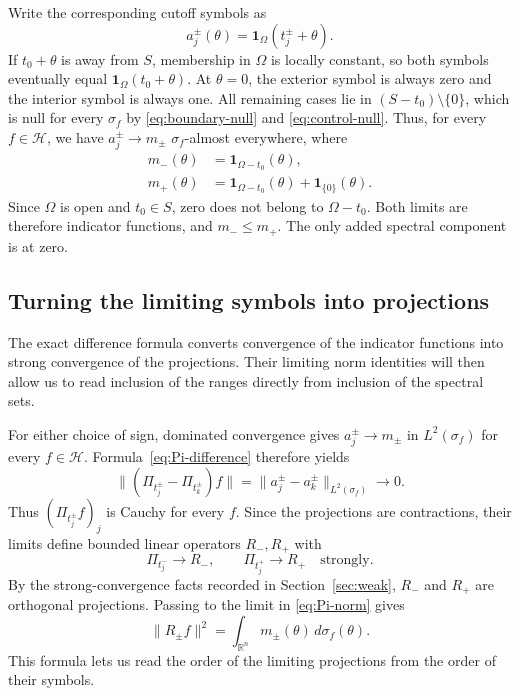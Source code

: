\documentclass[a4paper,12pt,reqno]{amsart}
\newcommand{\lead}[1]{\par\smallskip\noindent\leavevmode#1\par\smallskip}
\theoremstyle{remark}
\numberwithin{equation}{section}
\newcommand{\R}{\mathbb R}
\newcommand{\Hh}{\mathcal H}
\newcommand{\one}{\mathbf 1}
\begin{document}
Write the corresponding cutoff symbols as
\[
 a_j^\pm(\theta)=\one_\Omega(t_j^\pm+\theta).
\]
If $t_0+\theta$ is away from $S$, membership in $\Omega$ is locally
constant, so both symbols eventually equal
$\one_\Omega(t_0+\theta)$.  At $\theta=0$, the exterior symbol is
always zero and the interior symbol is always one.  All remaining
cases lie in $(S-t_0)\setminus\{0\}$, which is null for every
$\sigma_f$ by \eqref{eq:boundary-null} and \eqref{eq:control-null}.
Thus, for every $f\in\Hh$, we have $a_j^\pm\to m_\pm$
$\sigma_f$-almost everywhere, where
\begin{align}
 m_-(\theta)&=\one_{\Omega-t_0}(\theta),\label{eq:mminus}\\
 m_+(\theta)&=\one_{\Omega-t_0}(\theta)+\one_{\{0\}}(\theta).
 \label{eq:mplus}
\end{align}
Since $\Omega$ is open and $t_0\in S$, zero does not belong to
$\Omega-t_0$.  Both limits are therefore indicator functions, and
$m_-\leq m_+$.  The only added spectral component is at zero.

\subsection{Turning the limiting symbols into projections}

\lead{The exact difference formula converts convergence of the indicator
functions into strong convergence of the projections. Their limiting norm
identities will then allow us to read inclusion of the ranges directly
from inclusion of the spectral sets.}


For either choice of sign, dominated convergence gives
$a_j^\pm\to m_\pm$ in $L^2(\sigma_f)$ for every $f\in\Hh$.
Formula~\eqref{eq:Pi-difference} therefore yields
\[
 \|(\Pi_{t_j^\pm}-\Pi_{t_k^\pm})f\|
 =\|a_j^\pm-a_k^\pm\|_{L^2(\sigma_f)}
 \longrightarrow0.
\]
Thus $(\Pi_{t_j^\pm}f)_j$ is Cauchy for every $f$. Since the projections
are contractions, their limits define bounded linear operators $R_-,R_+$
with
\begin{equation}\label{eq:boundary-strong}
 \Pi_{t_j^-}\longrightarrow R_-,\qquad
 \Pi_{t_j^+}\longrightarrow R_+
 \quad\text{strongly}.
\end{equation}
By the strong-convergence facts recorded in Section~\ref{sec:weak},
$R_-$ and $R_+$ are orthogonal projections. Passing to the limit in
\eqref{eq:Pi-norm} gives
\begin{equation}\label{eq:boundary-norm}
 \|R_\pm f\|^2=\int_{\R^n}m_\pm(\theta)\,d\sigma_f(\theta).
\end{equation}
This formula lets us read the order of the limiting projections from
the order of their symbols.
\end{document}
